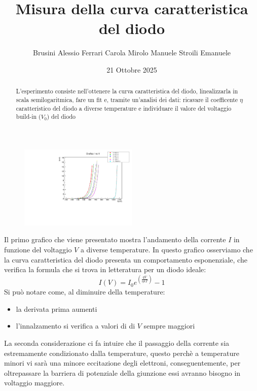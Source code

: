 \documentclass[10pt,twocolumn]{article}
\begin{document}
\justifying
	\title{\textbf{Misura della curva caratteristica del diodo}}
	\author{Brusini Alessio \hspace{0.7cm} Ferrari Carola \hspace{0.7cm} Mirolo Manuele \hspace{0.7cm} Stroili Emanuele}
	\date{21 Ottobre 2025}
	\maketitle
	\onecolumn
\vspace{3cm}
	\begin{abstract}
		\centering
		\large
    L'esperimento consiste nell'ottenere la curva caratteristica del diodo, linealizzarla in scala semilogaritmica, 
	fare un fit e, tramite un'analisi dei dati: ricavare il coefficente $\eta$ caratteristico del diodo a diverse temperature
	e individuare il valore del voltaggio build-in ($V_0$) del diodo

       
	\end{abstract}

	\newpage
\restoregeometry
\twocolumn

\begin{figure}[H] %
  \centering
  \includegraphics[width=0.5\textwidth]{I_vs_V.pdf} %
  \label{fig:II}
\end{figure}
Il primo grafico che viene presentato mostra l'andamento della corrente $I$ in funzione del voltaggio $V$ a diverse 
temperature. In questo grafico osserviamo che la curva caratteristica del diodo presenta un comportamento esponenziale, 
che verifica la formula che si trova in letteratura per un diodo ideale:
\[
\displaystyle I(V)= I_0 e^{(\frac{qV}{\eta kT})} - 1
\]
Si può notare come, al diminuire della temperature:

\begin{itemize}
  \item la derivata prima aumenti
  \item l'innalzamento si verifica a valori di di $V$ sempre maggiori
\end{itemize}
La seconda considerazione ci fa intuire che il passaggio della corrente sia estremamente condizionato dalla temperature, questo perchè 
a temperature minori vi sarà una minore eccitazione degli elettroni, conseguentemente, per oltrepassare la barriera di potenziale della giunzione
essi avranno bisogno in voltaggio maggiore.
\end{document}
